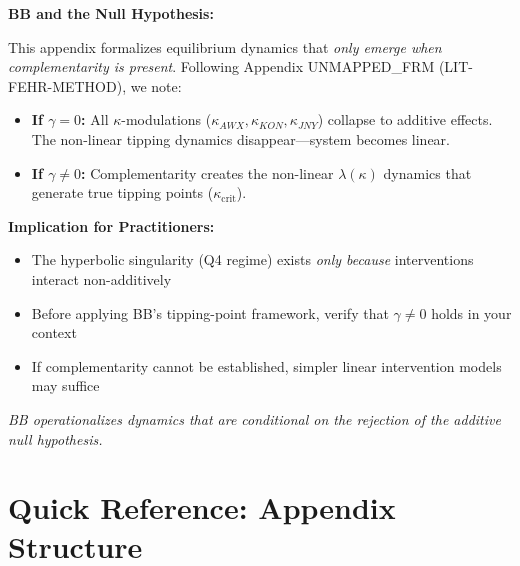 \documentclass[11pt, a4paper]{article}
\begin{document}

\begin{tcolorbox}[colback=red!5!white, colframe=red!75!black,
    title=\textbf{Methodological Note: Exclusion Principle (Appendix UNMAPPED_FRM)}]

\textbf{BB and the Null Hypothesis:}

This appendix formalizes equilibrium dynamics that \textit{only emerge when complementarity is present}.
Following Appendix UNMAPPED_FRM (LIT-FEHR-METHOD), we note:

\begin{itemize}[nosep]
    \item \textbf{If $\gamma = 0$:} All $\kappa$-modulations ($\kappa_{AWX}, \kappa_{KON}, \kappa_{JNY}$) collapse to additive effects. The non-linear tipping dynamics disappear---system becomes linear.
    \item \textbf{If $\gamma \neq 0$:} Complementarity creates the non-linear $\lambda(\kappa)$ dynamics that generate true tipping points ($\kappa_{\text{crit}}$).
\end{itemize}

\medskip
\textbf{Implication for Practitioners:}
\begin{itemize}[nosep]
    \item The hyperbolic singularity (Q4 regime) exists \textit{only because} interventions interact non-additively
    \item Before applying BB's tipping-point framework, verify that $\gamma \neq 0$ holds in your context
    \item If complementarity cannot be established, simpler linear intervention models may suffice
\end{itemize}

\textit{BB operationalizes dynamics that are conditional on the rejection of the additive null hypothesis.}
\end{tcolorbox}


\section*{Quick Reference: Appendix Structure}
\end{document}
